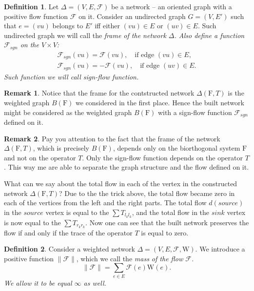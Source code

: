 \documentclass[12pt]{article}
\theoremstyle{definition}
\newtheorem{remark}{Remark}
\newtheorem{definition}{Definition}
\newcommand{\fsys}{\mathrm{F}}
\newcommand{\wt}{\mathrm{W}}
\newcommand{\flow}{\mathcal{F}}
\newcommand{\flowsgn}{\mathcal{F}_{sgn}}
\newcommand{\source}{\mathit{source}}
\newcommand{\sink}{\mathit{sink}}
\newcommand{\net}{\Delta}
\numberwithin{remark}{section}
\numberwithin{theorem}{section}
\numberwithin{prop}{section}
\numberwithin{equation}{section}
\numberwithin{lemma}{section}
\numberwithin{prop_under_lemma}{lemma}
\begin{document}
    \begin{definition}
      Let $\net=(V,E,\flow)$ be a network -- an oriented graph with a positive flow function $\flow$ on it.
      Consider an undirected graph $G=(V,E')$ such that $e=(vu)$ belongs to $E'$ iff
      either $(vu) \in E$ or $(uv) \in E$.
      Such undirected graph we will call the \it{frame} of the network $\net$.
      Also define a function $\flowsgn$ on the $V \times V$:
      \begin{align*}
        \flowsgn(vu) = \flow(vu), \quad \text{if edge } (vu) \in E,\\
        \flowsgn(vu) = -\flow(vu), \quad \text{if edge } (uv) \in E.
      \end{align*}
      Such function we will call \it{sign-flow} function.
    \end{definition}
    \begin{remark}
      Notice that the frame for the contstructed network $\net(\fsys, T)$ is the weighted graph $B(\fsys)$
      we considered in the first place.
      Hence the built network might be considered as the weighted graph $B(\fsys)$ with a sign-flow function
      $\flowsgn$ defined on it.
    \end{remark}
    \begin{remark}
      Pay you attention to the fact that the frame of the network $\net(\fsys, T)$, which is precisely $B(\fsys)$,
      depends only on the biorthogonal system $\fsys$ and not on the operator $T$.
      Only the sign-flow function depends on the operator $T$.
      This way me are able to separate the graph structure and the flow defined on it.
    \end{remark}
    What can we say about the total flow in each of the vertex in the constructed network $\net(\fsys, T)$?
    Due to the the trick above, the total flow became zero in each of the vertices from the left and the right parts.
    The total flow $d(\source)$ in the $\source$ vertex is equal to the $\sum T_{l_k l_k}$, and the total flow in the
    $\sink$ vertex is now equal to the $\sum T_{r_k r_k}$.
    Now one can see that the built network preserves the flow if and only if the trace of the operator $T$ is equal to
    zero.
    \begin{definition}
      Consider a weighted network $\net = (V, E, \flow, \wt)$.
      We introduce a positive function $\|\flow\|$, which we call the \it{mass of the flow} $\flow$.
      $$
        \|\flow\| = \sum_{e \in E} \flow(e) \wt(e).
      $$
      We allow it to be equal $\infty$ as well.
    \end{definition}
\end{document}
